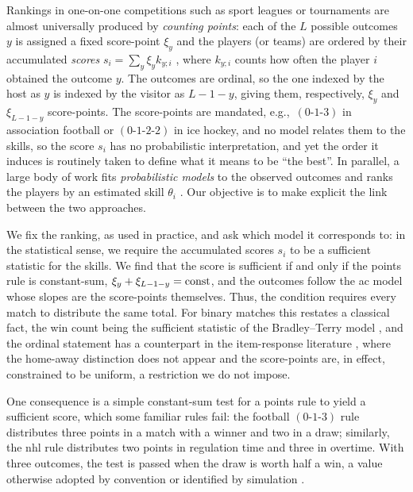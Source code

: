 \documentclass[letterpaper,12pt]{article}
\newcommand{\tnr}[1]{{\textnormal{#1}}}
\newcommand{\eg}{e.g.,~}	%
\begin{document}
Rankings in one-on-one competitions such as sport leagues or tournaments are almost universally produced by \emph{counting points}: each of the $L$ possible outcomes $y$ is assigned a fixed score-point $\xi_y$ and the players (or teams) are ordered by their accumulated \emph{scores} $s_i=\sum_y\xi_y k_{y;i}$ \citep{Langeville12_book}, where $k_{y;i}$ counts how often the player $i$ obtained the outcome $y$. The outcomes are ordinal, so the one indexed by the host as $y$ is indexed by the visitor as $L-1-y$, giving them, respectively, $\xi_y$ and $\xi_{L-1-y}$ score-points. The score-points are mandated, \eg $(0\text{-}1\text{-}3)$ in association football or $(0\text{-}1\text{-}2\text{-}2)$ in ice hockey, and no model relates them to the skills, so the score $s_i$ has no probabilistic interpretation, and yet the order it induces is routinely taken to define what it means to be ``the best''. In parallel, a large body of work fits \emph{probabilistic models} to the observed outcomes and ranks the players by an estimated skill $\theta_i$ \citep{Newman23}. Our objective is to make explicit the link between the two approaches.

We fix the ranking, as used in practice, and ask which model it corresponds to: in the statistical sense, we require the accumulated scores $s_i$ to be a sufficient statistic for the skills. We find that the score is sufficient if and only if the points rule is constant-sum, $\xi_y+\xi_{L-1-y}=\tnr{const}$, and the outcomes follow the \gls{ac} model whose slopes are the score-points themselves. Thus, the condition requires every match to distribute the same total. For binary matches this restates a classical fact, the win count being the sufficient statistic of the Bradley--Terry model \citep{Zermelo29,Bradley52,Ford57}, and the ordinal statement has a counterpart in the item-response literature \citep{Andersen77,Masters82}, where the home-away distinction does not appear and the score-points are, in effect, constrained to be uniform, a restriction we do not impose.

One consequence is a simple constant-sum test for a points rule to yield a sufficient score, which some familiar rules fail: the football $(0\text{-}1\text{-}3)$ rule distributes three points in a match with a winner and two in a draw; similarly, the \gls{nhl} rule distributes two points in regulation time and three in overtime. With three outcomes, the test is passed when the draw is worth half a win, a value otherwise adopted by convention or identified by simulation \citep{Lasek18}.
\end{document}
